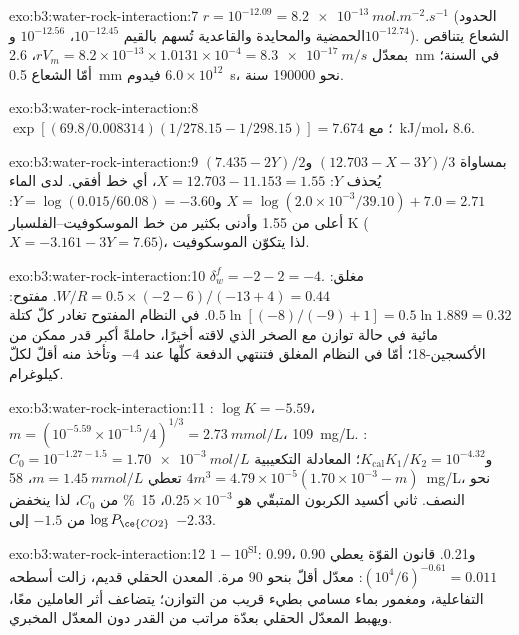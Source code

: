 \begin{solution}{exo:b3:water-rock-interaction:7}
$r = 10^{-12.09} = \qty{8.2e-13}{mol.m^{-2}.s^{-1}}$ (الحدود الحمضية والمحايدة
والقاعدية تُسهم بالقيم $10^{-12.45}$، $10^{-12.56}$ و$10^{-12.74}$). الشعاع
يتناقص بمعدّل $rV_m = 8.2\times10^{-13}\times1.0131\times10^{-4} =
\qty{8.3e-17}{m/s}$، \qty{2.6}{nm} في السنة؛ أمّا الشعاع \qty{0.5}{mm} فيدوم
$6.0\times10^{12}$~s، نحو \num{190000} سنة.
\end{solution}

\begin{solution}{exo:b3:water-rock-interaction:8}
$\exp[(69.8/0.008314)(1/278.15 - 1/298.15)] = 7.6$؛ مع
\qty{74}{kJ/mol}، 8.6.
\end{solution}

\begin{solution}{exo:b3:water-rock-interaction:9}
بمساواة $(12.703 - X - 3Y)/3$ و$(7.435 - 2Y)/2$ يُحذف $Y$: $X =
12.703 - 11.153 = 1.55$، أي خط أفقي. لدى الماء $X = \log(2.0\times
10^{-3}/39.10) + 7.0 = 2.71$ و$Y = \log(0.015/60.08) = -3.60$: أعلى من 1.55
وأدنى بكثير من خط الموسكوفيت--الفلسبار K ($X = -3.161 - 3Y = 7.65$)، لذا
يتكوّن الموسكوفيت.
\end{solution}

\begin{solution}{exo:b3:water-rock-interaction:10}
$\delta_w^f = -2 - 2 = -4$. مغلق: $W/R = 0.5\times(-2 - 6)/(-13 + 4) =
0.44$. مفتوح: $0.5\ln[(-8)/(-9) + 1] = 0.5\ln1.889 = 0.32$. في النظام المفتوح تغادر كلّ
كتلة مائية في حالة توازن مع الصخر الذي لاقته أخيرًا، حاملةً أكبر قدر ممكن من
الأكسجين-18؛ أمّا في النظام المغلق فتنتهي الدفعة كلّها عند $-4$
وتأخذ منه أقلّ لكلّ كيلوغرام.
\end{solution}

\begin{solution}{exo:b3:water-rock-interaction:11}
: $\log K = -5.59$، $m = (10^{-5.59}\times10^{-1.5}/4)^{1/3} =
\qty{2.73}{mmol/L}$، \qty{109}{mg/L}. : $C_0 = 10^{-1.27 - 1.5} =
\qty{1.70e-3}{mol/L}$ و$K_{\mathrm{cal}}K_1/K_2 = 10^{-4.32}$؛ المعادلة التكعيبية
$4m^3 = 4.79\times10^{-5}(1.70\times10^{-3} - m)$ تعطي $m =
\qty{1.45}{mmol/L}$، \qty{58}{mg/L}، نحو النصف. ثاني أكسيد الكربون المتبقّي هو
$0.25\times10^{-3}$، \qty{15}{\percent} من $C_0$، لذا ينخفض $\log P_{\ce{CO2}}$
من $-1.5$ إلى $-2.33$.
\end{solution}

\begin{solution}{exo:b3:water-rock-interaction:12}
$1 - 10^{\mathrm{SI}}$: 0.99، 0.90 و0.21. قانون القوّة يعطي
$(10^4/6)^{-0.61} = 0.011$: معدّل أقلّ بنحو 90 مرة. المعدن الحقلي
قديم، زالت أسطحه التفاعلية، ومغمور بماء مسامي بطيء قريب من
التوازن؛ يتضاعف أثر العاملين معًا، ويهبط المعدّل الحقلي بعدّة
مراتب من القدر دون المعدّل المخبري.
\end{solution}

